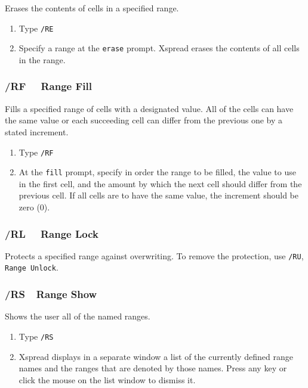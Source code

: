 \documentclass[titlepage]{article}
\begin{document}
Erases the contents of cells in a specified range.

\usage{}
\begin{enumerate}\itemsep -2pt
\item Type \texttt{/RE}
\item Specify a range at the \texttt{erase} prompt.  \textsf{Xspread}
  erases the contents of all cells in the range.
\end{enumerate}

\subsubsection{/RF \ \     Range Fill}

Fills a specified range of cells with a designated value.  All of the
cells can have the same value or each succeeding cell can differ from
the previous one by a stated increment.

\usage{}
\begin{enumerate}\itemsep -2pt
\item Type \texttt{/RF}
\item At the \texttt{fill} prompt, specify in order the range to be
  filled, the value to use in the first cell, and the amount by which
  the next cell should differ from the previous cell.  If all cells
  are to have the same value, the increment should be zero (0).
\end{enumerate}

\subsubsection{/RL \ \     Range Lock}

Protects a specified range against overwriting.  To remove the
protection, use \texttt{/RU}, \texttt{Range Unlock}.  
        
\subsubsection{/RS\ \      Range Show}

Shows the user all of the named ranges.

\usage{}
\begin{enumerate}\itemsep -2pt
\item Type \texttt{/RS}
\item \textsf{Xspread} displays in a separate window a list of the
  currently defined range names and the ranges that are denoted by
  those names.  Press any key or click the mouse on the list window
  to dismiss it.
\end{enumerate}
        
\end{document}
